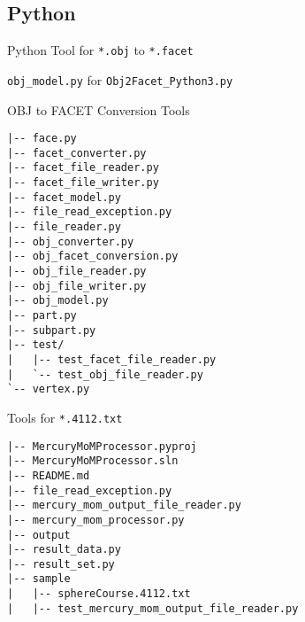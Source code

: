% 

\subsection{Python}
\renewcommand{\listingFontSize}{\tiny} 
\begin{frame}{Python Tool for \texttt{*.obj} to \texttt{*.facet}}
    \lstset{style=python} %
    
\end{frame}

\renewcommand{\listingFontSize}{\tiny} 
\begin{frame}{\texttt{obj\_model.py} for \texttt{Obj2Facet\_Python3.py}}
    \lstset{style=python} %
    
\end{frame}

\begin{frame}{OBJ to FACET Conversion Tools}
    \lstset{basicstyle=\ttfamily\footnotesize}
    \begin{lstlisting}
|-- face.py
|-- facet_converter.py
|-- facet_file_reader.py
|-- facet_file_writer.py
|-- facet_model.py
|-- file_read_exception.py
|-- file_reader.py
|-- obj_converter.py
|-- obj_facet_conversion.py
|-- obj_file_reader.py
|-- obj_file_writer.py
|-- obj_model.py
|-- part.py
|-- subpart.py
|-- test/
|   |-- test_facet_file_reader.py
|   `-- test_obj_file_reader.py
`-- vertex.py
    \end{lstlisting}
\end{frame}

\begin{frame}[fragile]{Tools for \texttt{*.4112.txt}}
    \begin{lstlisting}
|-- MercuryMoMProcessor.pyproj
|-- MercuryMoMProcessor.sln
|-- README.md
|-- file_read_exception.py
|-- mercury_mom_output_file_reader.py
|-- mercury_mom_processor.py
|-- output
|-- result_data.py
|-- result_set.py
|-- sample
|   |-- sphereCourse.4112.txt
|   |-- test_mercury_mom_output_file_reader.py
    \end{lstlisting}
\end{frame}

